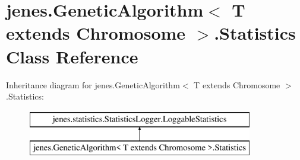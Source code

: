 \hypertarget{classjenes_1_1_genetic_algorithm_3_01_t_01extends_01_chromosome_01_4_1_1_statistics}{\section{jenes.\-Genetic\-Algorithm$<$ T extends Chromosome $>$.Statistics Class Reference}
\label{classjenes_1_1_genetic_algorithm_3_01_t_01extends_01_chromosome_01_4_1_1_statistics}
}
Inheritance diagram for jenes.\-Genetic\-Algorithm$<$ T extends Chromosome $>$.Statistics\-:\begin{figure}[H]
\begin{center}
\leavevmode
\includegraphics[height=2.000000cm]{classjenes_1_1_genetic_algorithm_3_01_t_01extends_01_chromosome_01_4_1_1_statistics}
\end{center}
\end{figure}
